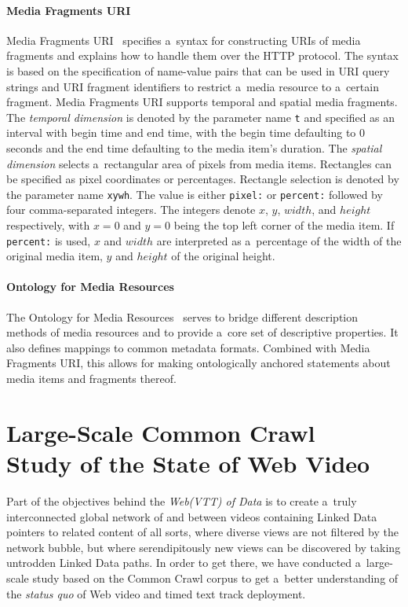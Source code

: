\documentclass{sig-alternate-ceur}
\begin{document}
\paragraph{Media Fragments URI}

Media Fragments URI~\cite{troncy2012mediafragments}
specifies a~syntax for constructing URIs of media fragments
and explains how to handle them over the HTTP protocol.
The syntax is based on the specification of
name-value pairs that can be used in URI query strings
and URI fragment identifiers to restrict a~media resource
to a~certain fragment.
Media Fragments URI supports temporal and spatial media fragments.
The \emph{temporal dimension} is denoted
by the parameter name \texttt{t} and specified
as an interval with begin time and end time,
with the begin time defaulting to 0 seconds
and the end time defaulting to the media item's duration.
The \emph{spatial dimension} selects
a~rectangular area of pixels from media items.
Rectangles can be specified as pixel coordinates or percentages.
Rectangle selection is denoted by the parameter name \texttt{xywh}.
The value is either \texttt{pixel:} or \texttt{percent:}
followed by four comma-separated integers.
The integers denote $x$, $y$, $width$, and $height$ respectively,
with $x = 0$ and $y = 0$ being the top left corner of the media item.
If \texttt{percent:} is used, $x$ and $width$ are interpreted
as a~percentage of the width of the original media item,
$y$ and $height$
of the original height.

\paragraph{Ontology for Media Resources}

The Ontology for Media Resources~\cite{lee2012mediaontology}
serves to bridge different description methods of media resources
and to provide a~core set of descriptive properties.
It also defines mappings to common metadata formats.
Combined with Media Fragments URI,
this allows for making ontologically anchored statements
about media items and fragments thereof.

\section{Large-Scale Common Crawl\\ Study of the State of Web Video}
\label{sec:large-scale-common-crawl-study-of-the-state-of-web-video}

Part of the objectives behind the \emph{Web(VTT) of Data}
is to create a~truly interconnected global network of and between videos
containing Linked Data pointers to related content of all sorts,
where diverse views are not filtered by the network bubble, 
but where serendipitously new views can be discovered
by taking untrodden Linked Data paths.
In order to get there,
we have conducted a~large-scale study
based on the Common Crawl corpus to get a~better understanding
of the \emph{status quo} of Web video and timed text track deployment.
\end{document}
